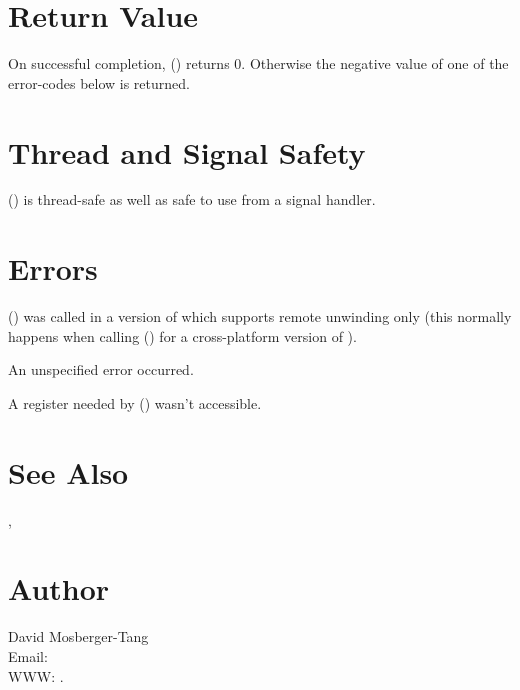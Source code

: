 \documentclass{article}
\begin{document}
\section{Return Value}

On successful completion, () returns 0.
Otherwise the negative value of one of the error-codes below is
returned.

\section{Thread and Signal Safety}

() is thread-safe as well as safe to use from a
signal handler.

\section{Errors}

\begin{Description}
\item[\Const{UNW\_EINVAL}] () was called in a
  version of  which supports remote unwinding only
  (this normally happens when calling () for a
  cross-platform version of ).
\item[\Const{UNW\_EUNSPEC}] An unspecified error occurred.
\item[\Const{UNW\_EBADREG}] A register needed by ()
  wasn't accessible.
\end{Description}

\section{See Also}

, 

\section{Author}

\noindent
David Mosberger-Tang\\
Email: \\
WWW: .
\LatexManEnd
\end{document}
